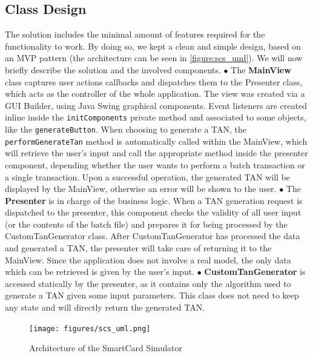 \subsection{Class Design}
The solution includes the minimal amount of features required for the functionality to work. By doing so, we kept a clean and simple design, based on an MVP pattern (the architecture can be seen in \autoref{figure:scs_uml}). We will now briefly describe the solution and the involved components.\newline
$\bullet$ The \textbf{MainView} class captures user actions callbacks and dispatches them to the Presenter class, which acts as the controller of the whole application. The view was created via a GUI Builder, using Java Swing graphical components.\newline
Event listeners are created inline inside the \texttt{initComponents} private method and associated to some objects, like the \texttt{generateButton}. When choosing to generate a TAN, the \texttt{performGenerateTan} method is automatically called within the MainView, which will retrieve the user's input and call the appropriate method inside the presenter component, depending whether the user wants to perform a batch transaction or a single transaction.\newline
Upon a successful operation, the generated TAN will be displayed by the MainView, otherwise an error will be shown to the user.\newline
$\bullet$ The \textbf{Presenter} is in charge of the business logic. When a TAN generation request is dispatched to the presenter, this component checks the validity of all user input (or the contents of the batch file) and prepares it for being processed by the CustomTanGenerator class. After CustomTanGenerator has processed the data and generated a TAN, the presenter will take care of returning it to the MainView.
Since the application does not involve a real model, the only data which can be retrieved is given by the user's input.\newline
$\bullet$ \textbf{CustomTanGenerator} is accessed statically by the presenter, as it contains only the algorithm used to generate a TAN given some input parameters. This class does not need to keep any state and will directly return the generated TAN.

\begin{figure}[h!tbp]
	\centering
	\texttt{[image: figures/scs\_uml.png]}
	\caption{Architecture of the SmartCard Simulator}
	\label{figure:scs_uml}
\end{figure}


